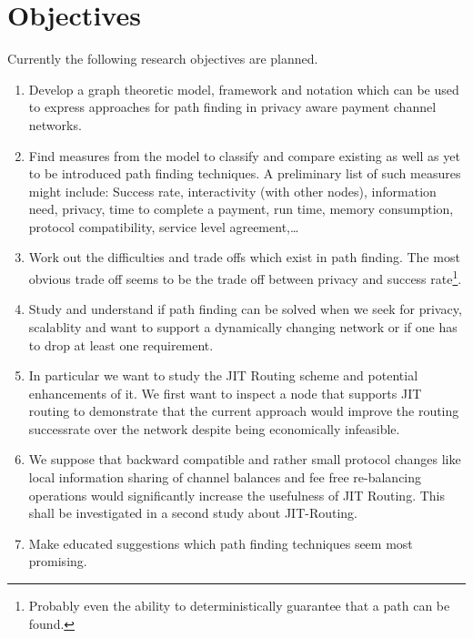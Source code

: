 \documentclass[a4paper]{paper}
\begin{document}
\section{Objectives}
Currently the following research objectives are planned.
\begin{enumerate}
\item Develop a graph theoretic model, framework and notation which can be used to express approaches for path finding in privacy aware payment channel networks.
\item Find measures from the model to classify and compare existing as well as yet to be introduced path finding techniques. A preliminary list of such measures might include: Success rate, interactivity (with other nodes), information need, privacy, time to complete a payment, run time, memory consumption, protocol compatibility, service level agreement,\dots
\item Work out the difficulties and trade offs which exist in path finding. The most obvious trade off seems to be the trade off between privacy and success rate\footnote{Probably even the ability to deterministically guarantee that a path can be found.}.
\item Study and understand if path finding can be solved when we seek for privacy, scalablity and want to support a dynamically changing network or if one has to drop at least one requirement. 
\item In particular we want to study the JIT Routing scheme and potential enhancements of it. We first want to inspect a node that supports JIT routing to demonstrate that the current approach would improve the routing successrate over the network despite being economically infeasible.
\item We suppose that backward compatible and rather small protocol changes like local information sharing of channel balances and fee free re-balancing operations would significantly increase the usefulness of JIT Routing. This shall be investigated in a second study about JIT-Routing. 
\item Make educated suggestions which path finding techniques seem most promising.
\end{enumerate}
\end{document}
